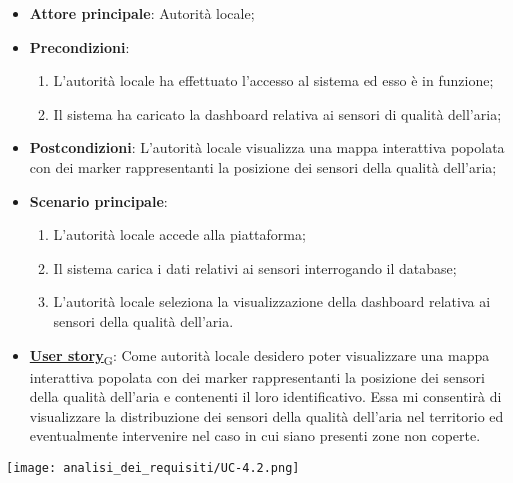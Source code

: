 \begin{itemize}
	\item \textbf{Attore principale}: Autorità locale;
	\item \textbf{Precondizioni}:
	      \begin{enumerate}
		      \item L'autorità locale ha effettuato l'accesso al sistema ed esso è in funzione;
		      \item Il sistema ha caricato la dashboard relativa ai sensori di qualità dell'aria;
	      \end{enumerate}
	\item \textbf{Postcondizioni}: L'autorità locale visualizza una mappa interattiva popolata con dei marker rappresentanti la posizione dei sensori della qualità dell'aria;
	\item \textbf{Scenario principale}:
	      \begin{enumerate}
		      \item L'autorità locale accede alla piattaforma;
		      \item Il sistema carica i dati relativi ai sensori interrogando il database;
		      \item L'autorità locale seleziona la visualizzazione della dashboard relativa ai sensori della qualità dell'aria.
	      \end{enumerate}
	\item \href{https://7last.github.io/docs/rtb/documentazione-interna/glossario\#user-story}{\textbf{User story}\textsubscript{G}}:
	      Come autorità locale desidero poter visualizzare una mappa interattiva popolata con dei marker rappresentanti la posizione dei sensori della qualità dell'aria
	      e contenenti il loro identificativo. Essa mi consentirà di visualizzare la distribuzione dei sensori della qualità dell'aria nel territorio ed eventualmente intervenire nel caso in cui siano presenti zone non coperte.
\end{itemize}
\begin{center}
	\texttt{[image: analisi\_dei\_requisiti/UC-4.2.png]}
\end{center}

